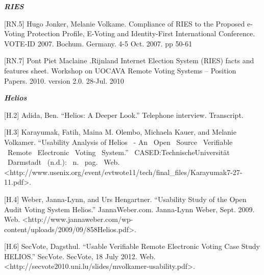 \textbf{\textit{RIES}}

[RN.5] Hugo Jonker, Melanie Volkame. Compliance of RIES to the Proposed e-Voting Protection Profile, E-Voting and Identity-First International Conference. VOTE-ID 2007. Bochum. Germany. 4-5 Oct. 2007. pp 50-61

[RN.7] Pont Piet Maclaine .Rijnland Internet Election System (RIES) facts and features sheet. Workshop on UOCAVA Remote Voting Systems -- Position Papers. 2010. version 2.0. 28-Jul. 2010

\textbf{\textit{Helios}}

[H.2] Adida, Ben. ``Helios: A Deeper Look.'' Telephone interview. Transcript.

[H.3] Karayumak, Fatih, Maina M. Olembo, Michaela Kauer, and Melanie Volkamer. ``Usability Analysis of Helios ~- An ~Open ~Source ~Verifiable ~Remote ~Electronic ~Voting ~System.'' ~CASED:TechnischeUniversität ~Darmstadt ~(n.d.): ~n. ~pag. ~Web. ~ {\textless}http://www.usenix.org/event/evtwote11/tech/final\_files/Karayumak7-27-11.pdf{\textgreater}.

[H.4] Weber, Janna-Lynn, and Urs Hengartner. ``Usability Study of the Open Audit Voting System Helios.'' JannaWeber.com. Janna-Lynn Weber, Sept. 2009. Web. {\textless}http://www.jannaweber.com/wp- \textcolor[rgb]{0.078431375,0.3254902,0.6901961}{content/uploads/2009/09/858Helios.pdf{\textgreater}.}

[H.6] SecVote, Dagsthul. ``Usable Verifiable Remote Electronic Voting Case Study HELIOS.'' SecVote. SecVote, 18 July 2012. Web. {\textless}http://secvote2010.uni.lu/slides/mvolkamer-usability.pdf{\textgreater}.

